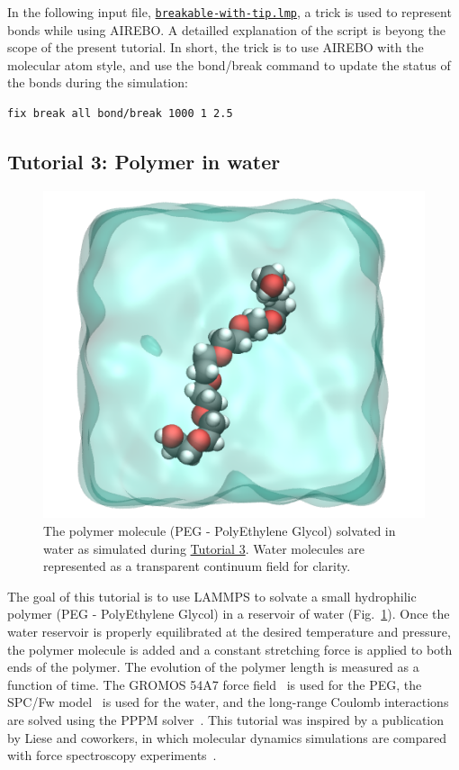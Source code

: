 \documentclass[9pt,tutorial]{livecoms}
\newcommand{\lmpcmd}[1]{\hspace{0pt}\colorbox{listing}{\textcolor{command}{\small{#1}}}\hspace{0pt}} %
\newcommand{\dwlcmd}[1]{\textcolor{download}{\texttt{#1}}} %
\newcommand{\filepath}{https://raw.githubusercontent.com/lammpstutorials/lammpstutorials-article/main/files/}
\begin{document}
In the following input file,
\href{\filepath tutorial2/breakable-with-tip.lmp}{\dwlcmd{breakable-with-tip.lmp}},
a trick is used to represent bonds while using AIREBO.  A detailled
explanation of the script is beyong the scope of the present tutorial.
In short, the trick is to use AIREBO with the molecular atom
style, and use the \lmpcmd{bond/break} command to update the status of the bonds
during the simulation:
\begin{lstlisting}
fix break all bond/break 1000 1 2.5
\end{lstlisting}

\subsection{Tutorial 3: Polymer in water}
\label{all-atom-label}

\begin{figure}
\centering
\includegraphics[width=0.55\linewidth]{PEG}
\caption{The polymer molecule (PEG - PolyEthylene Glycol) solvated in water as
simulated during \hyperref[all-atom-label]{Tutorial 3}.  Water molecules are
represented as a transparent continuum field for clarity.}
\label{fig:PEG}
\end{figure}

\noindent The goal of this tutorial is to use LAMMPS to solvate a small hydrophilic
polymer (PEG - PolyEthylene Glycol) in a reservoir of water (Fig.~\ref{fig:PEG}).
Once the water reservoir is properly equilibrated at the desired temperature and
pressure, the polymer molecule is added and a constant stretching force is applied
to both ends of the polymer.  The evolution of the polymer length is measured as
a function of time.  The GROMOS 54A7 force field~\cite{schmid2011definition} is used
for the PEG, the SPC/Fw model~\cite{wu2006flexible} is used for the water, and the
long-range Coulomb interactions are solved using the PPPM solver~\cite{luty1996calculating}.
This tutorial was inspired by a publication by Liese and coworkers, in which molecular
dynamics simulations are compared with force spectroscopy experiments~\cite{liese2017hydration}.
\end{document}

